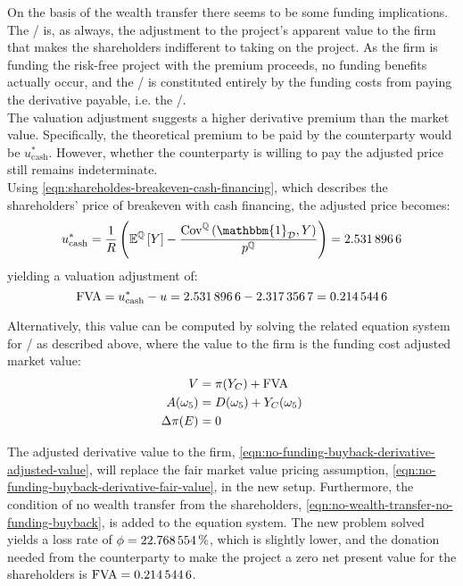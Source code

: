 \documentclass[../main.tex]{subfiles}
\begin{document}
            On the basis of the wealth transfer there seems to be some funding implications.
            The \FVA/ is, as always, the adjustment to the project's apparent value to the firm that makes the shareholders indifferent to taking on the project.
            As the firm is funding the risk-free project with the premium proceeds, no funding benefits actually occur, and the \FVA/ is constituted entirely by the funding costs from paying the derivative payable, i.e. the \FCA/.
            \\
            The valuation adjustment suggests a higher derivative premium than the market value.
            Specifically, the theoretical premium to be paid by the counterparty would be $u_{\text{cash}}^{\ast}$.
            However, whether the counterparty is willing to pay the adjusted price still remains indeterminate.
            \\
            Using \cref{eqn:shareholdes-breakeven-cash-financing}, which describes the shareholders' price of breakeven with cash financing, the adjusted price becomes:
            \begin{equation}
                u_{\text{cash}}^{\ast} = \discountfactor \left(
                    \mathbb{E}^{\rnmeasure}\left[Y\right] -
                    \frac{\text{Cov}^{\rnmeasure}\left(\mathbbm{1}_{\mathcal{D}},Y\right)}
                    {p^{\rnmeasure}}
                \right)
                = \num{2.5318966}
            \end{equation}
            yielding a valuation adjustment of:
            \begin{equation}
                \FVA/ = u_{\text{cash}}^{\ast} - u = \num{2.5318966} - \num{2.3173567} = \num{0.2145446}
            \end{equation}

            Alternatively, this value can be computed by solving the related equation system for \FCA/ as described above, where the value to the firm is the funding  cost adjusted market value:
            \begin{align}
                V &= \pi(Y_C) + \FVA/
                \label{eqn:no-funding-buyback-derivative-adjusted-value}
                \\
                A(\omega_5) &= D(\omega_5) + Y_C(\omega_5)
                \\
                \Delta \pi(E) &= 0
                \label{eqn:no-wealth-transfer-no-funding-buyback}
            \end{align}

            The adjusted derivative value to the firm, \cref{eqn:no-funding-buyback-derivative-adjusted-value},
            will replace the fair market value pricing assumption, \cref{eqn:no-funding-buyback-derivative-fair-value}, in the new setup.
            Furthermore, the condition of no wealth transfer from the shareholders, \cref{eqn:no-wealth-transfer-no-funding-buyback}, is added to the equation system.
            The new problem solved yields a loss rate of $\phi = \pct{0.22768554}$,
            which is slightly lower,
            and the donation needed from the counterparty to make the project a zero net present value for the shareholders is $\FVA/ = \num{0.2145446}$.
\end{document}
